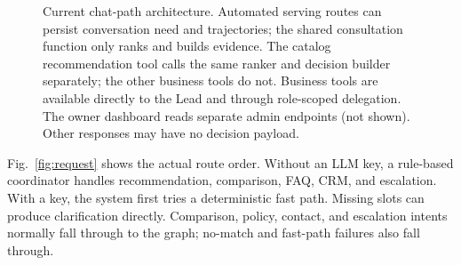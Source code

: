 \documentclass[conference,a4paper]{IEEEtran}
\begin{document}
\begin{figure}[t]
\caption{Current chat-path architecture. Automated serving routes can persist conversation need and trajectories; the shared consultation function only ranks and builds evidence. The catalog recommendation tool calls the same ranker and decision builder separately; the other business tools do not. Business tools are available directly to the Lead and through role-scoped delegation. The owner dashboard reads separate admin endpoints (not shown). Other responses may have no decision payload.}
\label{fig:architecture}
\end{figure}

Fig.~\ref{fig:request} shows the actual route order. Without an LLM key, a rule-based coordinator handles recommendation, comparison, FAQ, CRM, and escalation. With a key, the system first tries a deterministic fast path. Missing slots can produce clarification directly. Comparison, policy, contact, and escalation intents normally fall through to the graph; no-match and fast-path failures also fall through.
\end{document}
